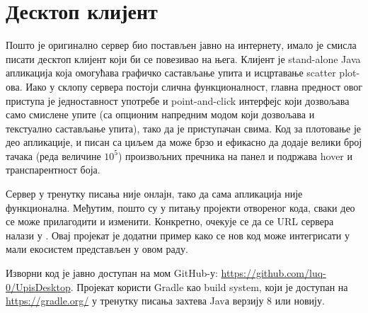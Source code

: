 \chapter{Десктоп клијент}\label{ch:A}

Пошто је оригинално сервер био постављен јавно на интернету, имало је смисла писати десктоп клијент који би се повезивао на њега. Клијент је stand-alone Java апликација која омогућава графичко састављање упита и исцртавање scatter plot-ова. Иако у склопу сервера постоји слична функционалност, главна предност овог приступа је једноставност употребе и point-and-click интерфејс који дозвољава само смислене упите (са опционим напредним модом који дозвољава и текстуално састављање упита), тако да је приступачан свима. Код за плотовање је део апликације, и писан са циљем да може брзо и ефикасно да додаје велики број тачака (реда величине $10^5$) произвољних пречника на панел и подржава hover и транспарентност боја.

Сервер у тренутку писања није онлајн, тако да сама апликација није функционална. Међутим, пошто су у питању пројекти отвореног кода, сваки део се може прилагодити и изменити. Конкретно, очекује се да се URL сервера налази у . Овај пројекат је додатни пример како се нов код може интегрисати у мали екосистем представљен у овом раду.

Изворни код је јавно доступан на мом GitHub-у: \url{https://github.com/luq-0/UpisDesktop}. Пројекат користи Gradle као build system, који је доступан на \url{https://gradle.org/} у тренутку писања захтева Javа верзију 8 или новију.